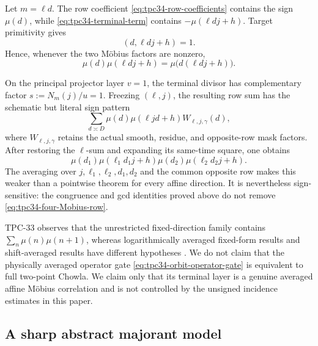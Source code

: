 Let \(m=\ell d\).  The row coefficient
\eqref{eq:tpc34-row-coefficients} contains the sign \(\mu(d)\), while
\eqref{eq:tpc34-terminal-term} contains
\(-\mu(\ell dj+h)\).  Target primitivity gives
\begin{equation}
 (d,\ell dj+h)=1.
 \label{eq:tpc34-row-target-coprime}
\end{equation}
Hence, whenever the two M\"obius factors are nonzero,
\begin{equation}
 \mu(d)\mu(\ell dj+h)
 =\mu\bigl(d(\ell dj+h)\bigr).
 \label{eq:tpc34-fused-terminal-sign}
\end{equation}

On the principal projector layer \(v=1\), the terminal divisor has
complementary factor \(s:=N_m(j)/u=1\).  Freezing \((\ell,j)\), the
resulting row sum has the schematic but literal sign pattern
\begin{equation}
 \sum_{d\asymp D}
 \mu(d)\mu(\ell jd+h)W_{\ell,j,\gamma}(d),
 \label{eq:tpc34-terminal-affine-Chowla}
\end{equation}
where \(W_{\ell,j,\gamma}\) retains the actual smooth, residue, and
opposite-row mask factors.  After restoring the \(\ell\)-sum and
expanding its same-time square, one obtains
\begin{equation}
 \mu(d_1)\mu(\ell_1d_1j+h)
 \mu(d_2)\mu(\ell_2d_2j+h).
 \label{eq:tpc34-four-Mobius-row}
\end{equation}
The averaging over \(j,\ell_1,\ell_2,d_1,d_2\) and the common opposite
row makes this weaker than a pointwise theorem for every affine
direction.  It is nevertheless sign-sensitive: the congruence and gcd
identities proved above do not remove
\eqref{eq:tpc34-four-Mobius-row}.

\begin{remark}
TPC-33 observes that the unrestricted fixed-direction family contains
\(\sum_n\mu(n)\mu(n+1)\), whereas logarithmically averaged fixed-form
results and shift-averaged results have different hypotheses
\citep{Tao2016LogChowla,MatomakiRadziwillTao2015,WangTPC33}.  We do not
claim that the physically averaged operator gate
\eqref{eq:tpc34-orbit-operator-gate} is equivalent to full two-point
Chowla.  We claim only that its terminal layer is a genuine averaged
affine M\"obius correlation and is not controlled by the unsigned
incidence estimates in this paper.
\end{remark}

\subsection{A sharp abstract majorant model}

